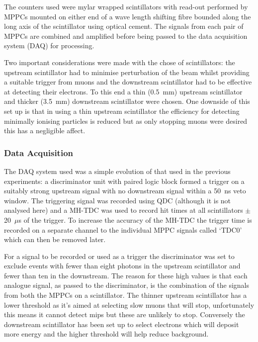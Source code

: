 The counters used were mylar wrapped scintillators with read-out performed by MPPCs mounted on either end of a wave length shifting fibre bounded along the long axis of the scintillator using optical cement. The signals from each pair of MPPCs are combined and amplified before being passed to the data acquisition system (DAQ) for processing.

Two important considerations were made with the chose of scintillators: the upstream scintillator had to minimise perturbation of the beam whilst providing a suitable trigger from muons and the downstream scintillator had to be effective at detecting their electrons. To this end a thin (0.5~mm) upstream scintillator and thicker (3.5~mm) downstream scintillator were chosen. One downside of this set up is that in using a thin upstream scintillator the efficiency for detecting minimally ionising particles is reduced but as only stopping muons were desired this has a negligible affect.

\subsubsection{Data Acquisition} %
\label{sub:data_acquisition}
The DAQ system used was a simple evolution of that used in the previous experiments: a discriminator unit with paired logic block formed a trigger on a suitably strong upstream signal with no downstream signal within a 50~ns veto window. The triggering signal was recorded using QDC (although it is not analysed here) and a MH-TDC was used to record hit times at all scintillators \(\pm\)20~\(\mu\)s of the trigger. To increase the accuracy of the MH-TDC the trigger time is recorded on a separate channel to the individual MPPC signals called `TDC0' which can then be removed later.

For a signal to be recorded or used as a trigger the discriminator was set to exclude events with fewer than eight photons in the upstream scintillator and fewer than ten in the downstream. The reason for these high values is that each analogue signal, as passed to the discriminator, is the combination of the signals from both the MPPCs on a scintillator. The thinner upstream scintillator has a lower threshold as it's aimed at selecting slow muons that will stop, unfortunately this means it cannot detect mips but these are unlikely to stop. Conversely the downstream scintillator has been set up to select electrons which will deposit more energy and the higher threshold will help reduce background.

